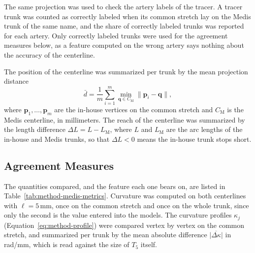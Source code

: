 The same projection was used to check the artery labels of the tracer.
A tracer trunk was counted as correctly labeled when its common stretch lay on the Medis trunk of the same name, and the share of correctly labeled trunks was reported for each artery.
Only correctly labeled trunks were used for the agreement measures below, as a feature computed on the wrong artery says nothing about the accuracy of the centerline.

The position of the centerline was summarized per trunk by the mean projection distance
\begin{equation}
  \bar{d} = \frac{1}{m} \sum_{i=1}^{m} \min_{\mathbf{q} \in C_\mathrm{M}} \lVert \mathbf{p}_i - \mathbf{q} \rVert ,
  \label{eq:method-medis-dist}
\end{equation}
where $\mathbf{p}_1, \dots, \mathbf{p}_m$ are the in-house vertices on the common stretch and $C_\mathrm{M}$ is the Medis centerline, in millimeters.
The reach of the centerline was summarized by the length difference $\Delta L = L - L_\mathrm{M}$, where $L$ and $L_\mathrm{M}$ are the arc lengths of the in-house and Medis trunks, so that $\Delta L < 0$ means the in-house trunk stops short.

\subsection{Agreement Measures}
\label{sec:method-medis-metrics}

The quantities compared, and the feature each one bears on, are listed in Table~\ref{tab:method-medis-metrics}.
Curvature was computed on both centerlines with $\ell = 5$\,mm, once on the common stretch and once on the whole trunk, since only the second is the value entered into the models.
The curvature profiles $\kappa_j$ (Equation~\ref{eq:method-profile}) were compared vertex by vertex on the common stretch, and summarized per trunk by the mean absolute difference $\overline{|\Delta\kappa|}$ in rad/mm, which is read against the size of $T_5$ itself.

